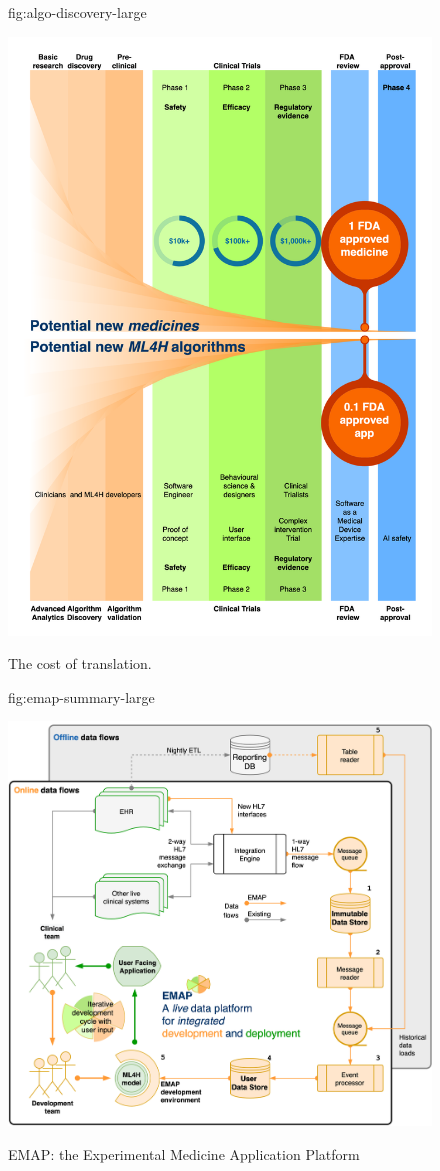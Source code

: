 \documentclass[pmlr,twocolumn,10pt]{jmlr} %
\begin{document}
\begin{figure}[htbp]
\floatconts
  {fig:algo-discovery-large}
  {\caption{The cost of translation.}}
 {\includegraphics[width=1.0\textwidth]{images/emap-summary-funnel.png}}

\end{figure}

\begin{figure}[htbp]
\floatconts
  {fig:emap-summary-large}
  {\caption{EMAP: the Experimental Medicine Application Platform}}
 {\includegraphics[width=1.0\textwidth]{images/emap-summary-emap-summary.png}}

\end{figure}
\end{document}
